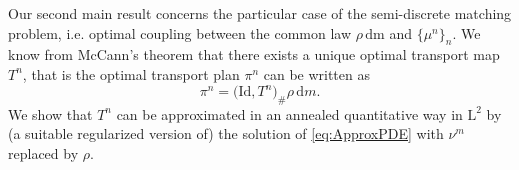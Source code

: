 \documentclass[11pt,a4paper,oneside]{amsart}
\numberwithin{equation}{section}
\newtheorem{corollary}[theorem]{Corollary}
\newcommand{\dd}{\mathrm{d}}
\newcommand{\LL}{\mathrm{L}}
\newcommand{\m}{\mathrm{m}}
\begin{document}
%
Our second main result concerns the particular case of the semi-discrete matching problem, i.e. optimal coupling between the common law $\rho\,\dd \m$ and $\{\mu^n\}_n$. We know from McCann's theorem \cite{McCann2001} that there exists a unique optimal transport map $T^n$, that is the optimal transport plan $\pi^n$ can be written as 
%
$$\pi^n=\big(\text{Id},T^n\big)_\#\rho\,\dd m.$$
%
We show that $T^n$ can be approximated in an annealed quantitative way in $\LL^2$ by (a suitable regularized version of) the solution of \eqref{eq:ApproxPDE} with $\nu^m$ replaced by $\rho$.
%
%
%
%
%
%
%
%
%
%

%
%

%
%
%
\end{document}

